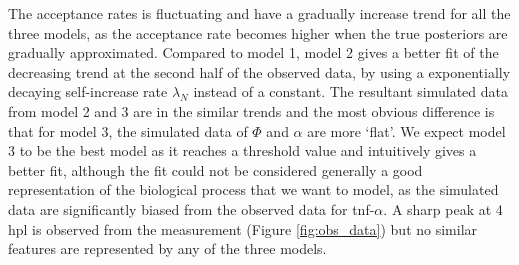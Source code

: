 \documentclass[12pt,a4paper]{report}
\begin{document}
The acceptance rates is fluctuating and have a gradually increase trend for all the three models, as the acceptance rate becomes higher when the true posteriors are gradually approximated. Compared to model 1, model 2 gives a better fit of the decreasing trend at the second half of the observed data, by using a exponentially decaying self-increase rate $\lambda_N$ instead of a constant. The resultant simulated data from model 2 and 3 are in the similar trends and the most obvious difference is that for model 3, the simulated data of $\Phi$ and $\alpha$ are more `flat'. We expect model 3 to be the best model as it reaches a threshold value and intuitively gives a better fit, although the fit could not be considered generally a good representation of the biological process that we want to model, as the simulated data are significantly biased from the observed data for tnf-$\alpha$. A sharp peak at 4 hpl is observed from the measurement (Figure \ref{fig:obs_data}) but no similar features are represented by any of the three models.
\end{document}
